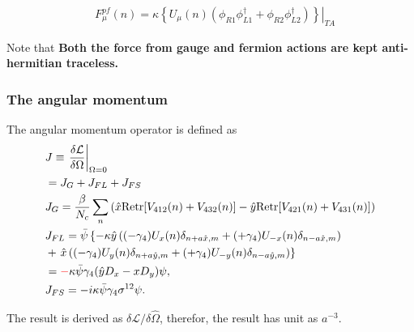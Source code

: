 \begin{equation}
\begin{split}
&F^{pf}_{\mu}(n)=\kappa \left.\left\{U_{\mu}(n)\left(\phi _{R1}\phi _{L1}^{\dagger}+\phi _{R2}\phi _{L2}^{\dagger}\right)\right\}\right|_{TA}
\end{split}
\end{equation}

Note that \textbf{Both the force from gauge and fermion actions are kept anti-hermitian traceless.}

\subsubsection{\label{sec:AngularMomentum}The angular momentum}

The angular momentum operator is defined as
\begin{equation}
\begin{split}
&J\equiv \left.\frac{\delta \mathcal{L}}{\delta \Omega}\right|_{\Omega = 0}\\
&=J_G+J_{FL}+J_{FS}\\
&J_G=\frac{\beta}{N_c}\sum _n \left(\hat{x}{\rm Retr}[V_{412}(n)+V_{432}(n)]-\hat{y}{\rm Retr}[V_{421}(n)+V_{431}(n)]\right)\\
&J_{FL}=\bar{\psi}\left\{-\kappa \hat{y}\left((-\gamma _4)U_{x}(n)\delta _{n+a\hat{x},m}+(+\gamma _4)U_{-x}(n)\delta _{n-a\hat{x},m}\right)\right.\\
&+\left.\hat{x}\left((-\gamma _4)U_{y}(n)\delta _{n+a\hat{y},m}+(+\gamma _4)U_{-y}(n)\delta _{n-a\hat{y},m}\right)\right\}\\
&=\textcolor[rgb]{1,0,0}{-}\kappa \bar{\psi}\gamma _4 (\hat{y}D_x-xD_y)\psi,\\
&J_{FS}=-i\kappa \bar{\psi} \gamma _4 \sigma ^{12} \psi.\\
\end{split}
\end{equation}

The result is derived as $\delta \mathcal{L}/\delta \hat{\Omega}$, therefor, the result has unit as $a^{-3}$.

